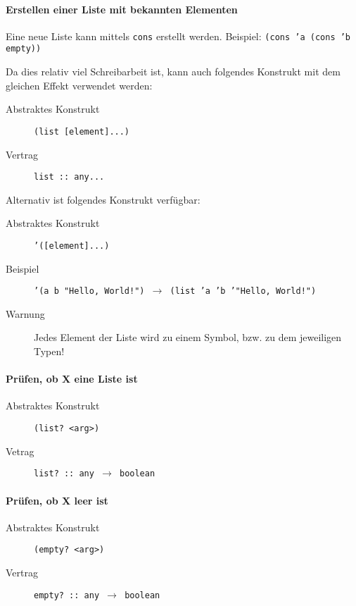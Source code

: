 \documentclass[a4paper, 11pt, accentcolor = tud3b]{tudreport}
\begin{document}
                \paragraph{Erstellen einer Liste mit bekannten Elementen}
                    Eine neue Liste kann mittels \texttt{cons} erstellt werden. Beispiel: \texttt{(cons 'a (cons 'b empty))}

                    Da dies relativ viel Schreibarbeit ist, kann auch folgendes Konstrukt mit dem gleichen Effekt verwendet werden:
                    \begin{description}
                        \item[Abstraktes Konstrukt] \texttt{(list [element]...)}
                        \item[Vertrag] \texttt{list :: any...}
                    \end{description}

                    Alternativ ist folgendes Konstrukt verfügbar:
                    \begin{description}
                        \item[Abstraktes Konstrukt] \texttt{'([element]...)}
                        \item[Beispiel] \texttt{'(a b "Hello, World!") $ \rightarrow $ (list 'a 'b '"Hello, World!")}
                        \item[Warnung] Jedes Element der Liste wird zu einem Symbol, bzw. zu dem jeweiligen Typen!
                    \end{description}

                \paragraph{Prüfen, ob X eine Liste ist}
                    \begin{description}
                        \item[Abstraktes Konstrukt] \texttt{(list? <arg>)}
                        \item[Vetrag] \texttt{list? :: any $ \rightarrow $ boolean}
                    \end{description}

                \paragraph{Prüfen, ob X leer ist}
                    \begin{description}
                        \item[Abstraktes Konstrukt] \texttt{(empty? <arg>)}
                        \item[Vertrag] \texttt{empty? :: any $ \rightarrow $ boolean}
                    \end{description}
\end{document}
